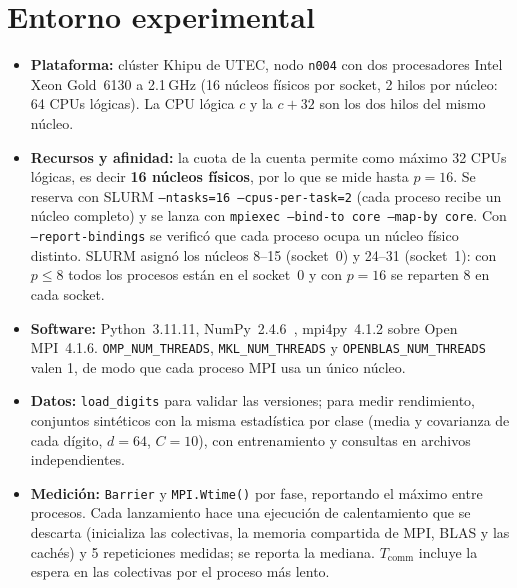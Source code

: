 \documentclass[11pt,a4paper]{article}
\newcommand{\Tcomm}{T_{\text{comm}}}
\begin{document}
\section{Entorno experimental}
\label{sec:entorno}
\begin{itemize}
  \item \textbf{Plataforma:} clúster Khipu de UTEC, nodo \texttt{n004} con dos procesadores Intel
        Xeon Gold~6130 a 2.1\,GHz (16 núcleos físicos por socket, 2 hilos por núcleo: 64 CPUs
        lógicas). La CPU lógica $c$ y la $c+32$ son los dos hilos del mismo núcleo.
  \item \textbf{Recursos y afinidad:} la cuota de la cuenta permite como máximo 32 CPUs lógicas,
        es decir \textbf{16 núcleos físicos}, por lo que se mide hasta $p=16$. Se reserva con SLURM
        \texttt{--ntasks=16 --cpus-per-task=2} (cada proceso recibe un núcleo completo) y se lanza con
        \texttt{mpiexec --bind-to core --map-by core}. Con \texttt{--report-bindings} se verificó
        que cada proceso ocupa un núcleo físico distinto. SLURM asignó los núcleos 8--15
        (socket~0) y 24--31 (socket~1): con $p\le8$ todos los procesos están en el socket~0 y con
        $p=16$ se reparten 8 en cada socket.
  \item \textbf{Software:} Python~3.11.11, NumPy~2.4.6~\cite{harris2020}, mpi4py~4.1.2
        \cite{dalcin2021,mpi4pydoc} sobre Open MPI~4.1.6. \texttt{OMP\_NUM\_THREADS},
        \texttt{MKL\_NUM\_THREADS} y \texttt{OPENBLAS\_NUM\_THREADS} valen 1, de modo que cada proceso
        MPI usa un único núcleo.
  \item \textbf{Datos:} \texttt{load\_digits} para validar las versiones; para medir rendimiento,
        conjuntos sintéticos con la misma estadística por clase (media y covarianza de cada dígito,
        $d=64$, $C=10$), con entrenamiento y consultas en archivos independientes.
  \item \textbf{Medición:} \texttt{Barrier} y \texttt{MPI.Wtime()} por fase, reportando el máximo
        entre procesos. Cada lanzamiento hace una ejecución de calentamiento que se descarta
        (inicializa las colectivas, la memoria compartida de MPI, BLAS y las cachés) y 5 repeticiones
        medidas; se reporta la mediana. $\Tcomm$ incluye la espera en las colectivas por el proceso
        más lento.
\end{itemize}


\end{document}
